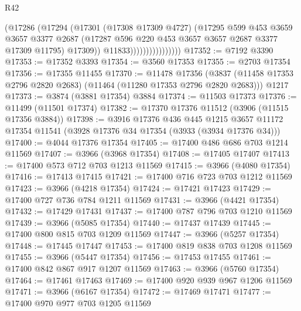 \begin{lexlean}{R42}
\begin{coremodule}
                                (@17286
                                  (@17294
                                    (@17301
                                      (@17308 @17309 @4727)
                                      (@17295
                                        @599
                                        @453
                                        @3659
                                        @3657
                                        @3377
                                        @2687
                                        (@17287
                                          @596
                                          @220
                                          @453
                                          @3657
                                          @3657
                                          @2687
                                          @3377
                                          @17309
                                          @11795)
                                        @17309))
                                    @11833))))))))))))))))
@17352 := @7192 @3390
@17353 := @17352 @3393
@17354 := @3560 @17353
@17355 := @2703 @17354
@17356 := @17355 @11455
@17370 := @11478
    @17356
    (@3837 (@11458 @17353 @2796 @2820 @2683) (@11464 (@11280 @17353 @2796 @2820 @2683)))
    @1217
@17373 := @3874 (@3881 @17354) @3884
@17374 := @11503 @17373
@17376 := @11499 (@11501 @17374)
@17382 := @17370 @17376 @11512 (@3906 (@11515 @17356 @3884))
@17398 := @3916
    @17376
    @436
    @445
    @1215
    @3657
    @11172
    @17354
    @11541
    (@3928 @17376 @34 @17354 (@3933 (@3934 @17376 @34)))
@17400 := @4044 @17376 @17354
@17405 := @17400 @486 @686 @703 @1214 @11569
@17407 := @3966 (@3968 @17354)
@17408 := @17405 @17407
@17413 := @17400 @573 @712 @703 @1213 @11569
@17415 := @3966 (@4080 @17354)
@17416 := @17413 @17415
@17421 := @17400 @716 @723 @703 @1212 @11569
@17423 := @3966 (@4218 @17354)
@17424 := @17421 @17423
@17429 := @17400 @727 @736 @784 @1211 @11569
@17431 := @3966 (@4421 @17354)
@17432 := @17429 @17431
@17437 := @17400 @787 @796 @703 @1210 @11569
@17439 := @3966 (@5085 @17354)
@17440 := @17437 @17439
@17445 := @17400 @800 @815 @703 @1209 @11569
@17447 := @3966 (@5257 @17354)
@17448 := @17445 @17447
@17453 := @17400 @819 @838 @703 @1208 @11569
@17455 := @3966 (@5447 @17354)
@17456 := @17453 @17455
@17461 := @17400 @842 @867 @917 @1207 @11569
@17463 := @3966 (@5760 @17354)
@17464 := @17461 @17463
@17469 := @17400 @920 @939 @967 @1206 @11569
@17471 := @3966 (@6167 @17354)
@17472 := @17469 @17471
@17477 := @17400 @970 @977 @703 @1205 @11569

\end{coremodule}
\end{lexlean}
